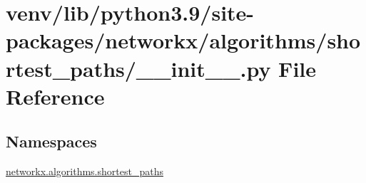 \hypertarget{venv_2lib_2python3_89_2site-packages_2networkx_2algorithms_2shortest__paths_2____init_____8py}{}\section{venv/lib/python3.9/site-\/packages/networkx/algorithms/shortest\+\_\+paths/\+\_\+\+\_\+init\+\_\+\+\_\+.py File Reference}
\label{venv_2lib_2python3_89_2site-packages_2networkx_2algorithms_2shortest__paths_2____init_____8py}
\subsection*{Namespaces}
\begin{DoxyCompactItemize}
\item 
 \hyperlink{namespacenetworkx_1_1algorithms_1_1shortest__paths}{networkx.\+algorithms.\+shortest\+\_\+paths}
\end{DoxyCompactItemize}
